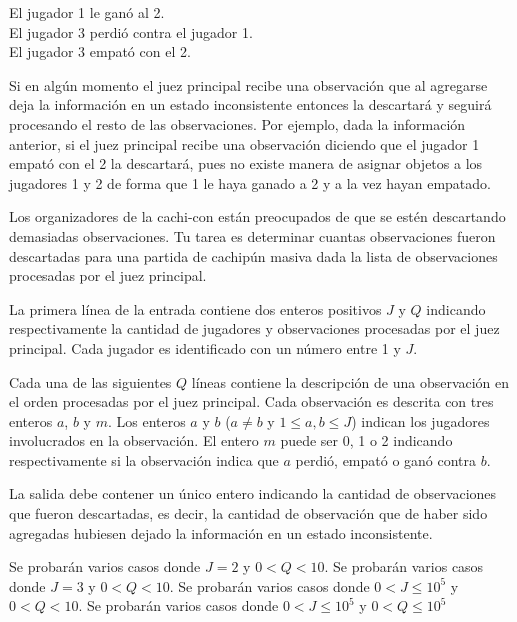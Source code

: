 \documentclass{oci}
\begin{document}
\begin{problemDescription}
    \begin{center}
      El jugador 1 le ganó al 2.\\
      El jugador 3 perdió contra el jugador 1.\\
      El jugador 3 empató con el 2.
    \end{center}

  Si en algún momento el juez principal recibe una observación que al agregarse
  deja la información en un estado inconsistente entonces la descartará y
  seguirá procesando el resto de las observaciones.
  Por ejemplo, dada la información anterior, si el juez principal recibe una
  observación diciendo que el jugador 1 empató con el 2 la descartará, pues
  no existe manera de asignar objetos a los jugadores 1 y 2 de forma que 1 le
  haya ganado a 2 y a la vez hayan empatado.

  Los organizadores de la cachi-con están preocupados de que se estén
  descartando demasiadas observaciones.
  Tu tarea es determinar cuantas observaciones fueron descartadas para una
  partida de cachipún masiva dada la lista de observaciones procesadas por el
  juez principal.
\end{problemDescription}

\begin{inputDescription}
  La primera línea de la entrada contiene dos enteros positivos $J$ y $Q$
  indicando respectivamente la cantidad de jugadores y observaciones procesadas
  por el juez principal.
  Cada jugador es identificado con un número entre 1 y $J$.

  Cada una de las siguientes $Q$ líneas contiene la descripción
  de una observación en el orden procesadas por el juez principal.
  Cada observación es descrita con tres enteros $a$, $b$ y $m$.
  Los enteros $a$ y $b$ ($a\neq b$ y $1\leq a, b \leq J$) indican los jugadores
  involucrados en la observación. 
  El entero $m$ puede ser 0, 1 o 2 indicando respectivamente si la observación indica
  que $a$ perdió, empató o ganó contra $b$.
\end{inputDescription}

\begin{outputDescription}
  La salida debe contener un único entero indicando la cantidad de observaciones
  que fueron descartadas, es decir, la cantidad de observación que de haber sido
  agregadas hubiesen dejado la información en un estado inconsistente.
\end{outputDescription}

\begin{scoreDescription}
   Se probarán varios casos donde $J=2$ y $0 < Q < 10$.
   Se probarán varios casos donde $J=3$ y $0 < Q < 10$.
   Se probarán varios casos donde $0 < J \leq 10^5$ y $0 < Q < 10$.
   Se probarán varios casos donde $0 < J \leq 10^5$ y $0 < Q \leq 10^5$
\end{scoreDescription}

\begin{sampleDescription}
\end{sampleDescription}
\end{document}
